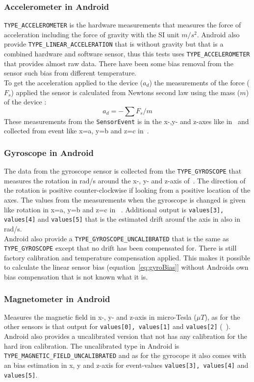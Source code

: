 \subsubsection{Accelerometer in Android}\label{subsec:accAndroid}
\texttt{TYPE\_ACCELEROMETER} is the hardware measurements that measures the force of acceleration including the force of gravity with the SI unit $m/s^2$. Android also provide \texttt{TYPE\_LINEAR\_ACCELERATION} that is without gravity but that is a combined hardware and software sensor, thus this tests uses  \texttt{TYPE\_ACCELEROMETER} that provides almost raw data. There have been some bias removal from the sensor such bias from different temperature. \\
To get the acceleration applied to the device ($a_d$) the measurements of the force ($F_s$) applied the sensor is calculated from Newtons second law using the mass ($m$) of the device :
$$a_d=-\sum F_s / m $$ 
These measurements from the \texttt{SensorEvent} is in the x-,y- and z-axes like in~ and collected from event like x=a, y=b and z=c in~. \cite[]{android:sensorEvent}


\subsubsection{Gyroscope in Android}\label{subsec:gyroAndroid}
The data from the gyroscope sensor is collected from the \texttt{TYPE\_GYROSCOPE} that measures the rotation in rad/s around the x-, y- and z-axis of~. The direction of the rotation is positive counter-clockwise if looking from a positive location of the axes. The values from the measurements when the gyroscope is changed is given like rotation in x=a, y=b and z=c in ~. Additional output is \texttt{values[3], values[4]} and \texttt{values[5]} that is the estimated drift arounf the axis in also in rad/s.\\
Android also provide a \texttt{TYPE\_GYROSCOPE\_UNCALIBRATED} that is the same as \texttt{TYPE\_GYROSCOPE} except that no drift has been compensated for. There is still factory calibration and temperature compensation applied. \cite[]{android:sensorEvent} This makes it possible to calculate the linear sensor bias (equation~\ref{eq:gyroBias}] without Androids own bias compensation that is not known what it is.



\subsubsection{Magnetometer in Android}\label{subsec:magnAndroid}
Measures the magnetic field in x-, y- and z-axis in micro-Tesla ($\mu T$), as for the other sensors is that output for \texttt{values[0], values[1]} and \texttt{values[2]} (~). Android also provides a uncalibrated version that not has any calibration for the hard iron calibration. The uncalibrated type in Android is \texttt{TYPE\_MAGNETIC\_FIELD\_UNCALIBRATED} and as for the gyrocope it also comes with an bias estimation in x, y and z-axis for event-values \texttt{values[3], values[4]} and \texttt{values[5]}. 

